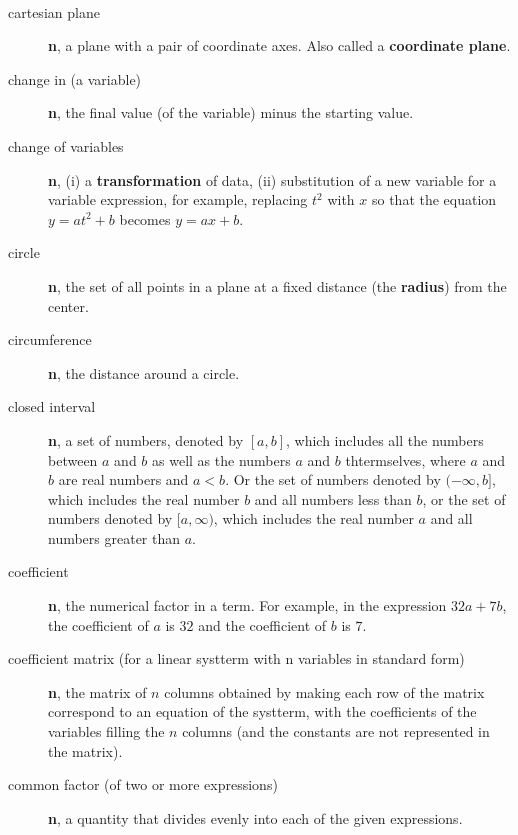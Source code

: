 \documentclass[10pt,]{book}
\newcommand{\terminology}[1]{\textbf{#1}}
\theoremstyle{plain}
\theoremstyle{definition}
\theoremstyle{definition}
\theoremstyle{definition}
\numberwithin{equation}{part}
\newcommand{\lt}{<}
\begin{document}
\paragraph[{}]{}\hypertarget{paragraphs-7}{}
\leavevmode%
\begin{description}
\item[{cartesian plane}]\hypertarget{li-484}{}\terminology{n}, a plane with a pair of coordinate axes. Also called a \terminology{coordinate plane}.%
\item[{change in (a variable)}]\hypertarget{li-485}{}\terminology{n}, the final value (of the variable) minus the starting value.%
\item[{change of variables}]\hypertarget{li-486}{}\terminology{n}, (i) a \terminology{transformation} of data, (ii) substitution of a new variable for a variable expression, for example, replacing \(t^2\) with \(x\) so that the equation \(y = at^2 + b\) becomes \(y = ax + b\).%
\item[{circle}]\hypertarget{li-487}{}\terminology{n}, the set of all points in a plane at a fixed distance (the \terminology{radius}) from the center.%
\item[{circumference}]\hypertarget{li-488}{}\terminology{n}, the distance around a circle.%
\item[{closed interval}]\hypertarget{li-489}{}\terminology{n}, a set of numbers, denoted by \([a, b]\), which includes all the numbers between \(a\) and \(b\) as well as the numbers \(a\) and \(b\) thtermselves, where \(a\) and \(b\) are real numbers and \(a \lt b\). Or the set of numbers denoted by \((−\infty, b]\), which includes the real number \(b\) and all numbers less than \(b\), or the set of numbers denoted by \([a, \infty)\), which includes the real number \(a\) and all numbers greater than \(a\).%
\item[{coefficient}]\hypertarget{li-490}{}\terminology{n}, the numerical factor in a term. For example, in the expression \(32a + 7b\), the coefficient of \(a\) is \(32\) and the coefficient of \(b\) is \(7\).%
\item[{coefficient matrix (for a linear systterm with n variables in standard form)}]\hypertarget{li-491}{}\terminology{n}, the matrix of \(n\) columns obtained by making each row of the matrix correspond to an equation of the systterm, with the coefficients of the variables filling the \(n\) columns (and the constants are not represented in the matrix).%
\item[{common factor (of two or more expressions)}]\hypertarget{li-492}{}\terminology{n}, a quantity that divides evenly into each of the given expressions.%

\end{description}
\end{document}
